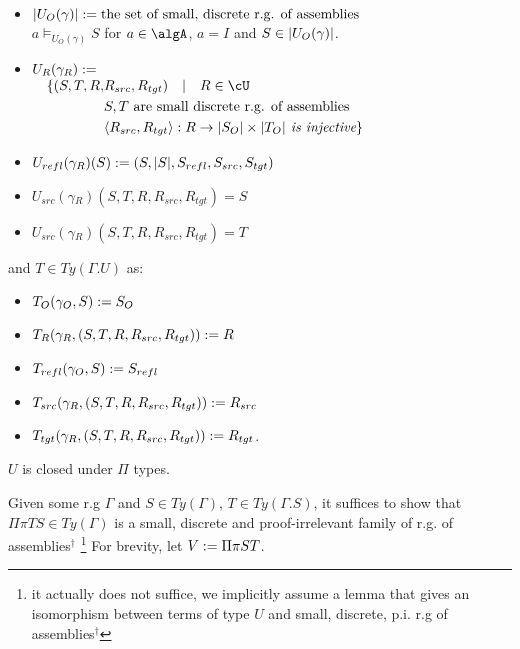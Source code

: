 \documentclass[12pt,a4paper]{article}
\def\src{_{src}}
\def\rfl{_{refl}}
\def\tgt{_{tgt}}
\renewcommand{\O}{_{O}}\alwaysmath{O}
\newcommand{\R}{\ensuremath{_{R}}}
\begin{document}
\begin{itemize}
  \item $\carr{U\O(\gamma)} \define \text{the set of small, discrete r.g. of assemblies}$ \\
   $a \vDash_{U\O(\gamma)} S$ for $a \in \algA$, $a = I$ and $S \in \carr{U\O(\gamma)}$. 
   
  \item $U\R(\gamma\R) \define$\\
  $\begin{aligned}
   \quad \{(S,T, R, & R\src, R\tgt) \quad|\quad R \in \cU \\
    & S,T \text{ are small discrete r.g. of assemblies} \\
    & \langle R\src, R\tgt\rangle : R \to \carr{S\O} \times \carr{T\O} \textit { is injective} \}
  \end{aligned}$
  
  \item $U\rfl(\gamma\R)(S) \define (S, \carr{S}, S\rfl, S\src, S\tgt)$
  
  \item $U\src(\gamma\R)(S, T, R, R\src, R\tgt) = S$
  
  \item $U\src(\gamma\R)(S, T, R, R\src, R\tgt) = T$
\end{itemize}
and $T \in Ty(\Gamma . U)$ as:
\begin{itemize}
  \item $T\O(\gamma\O, S) \define S\O$
  \item $T\R(\gamma\R, (S,T, R, R\src, R\tgt)) \define R$
  \item $T\rfl(\gamma\O, S) \define S\rfl$
  \item $T\src(\gamma\R, (S,T, R, R\src, R\tgt)) \define R\src$
  \item $T\tgt(\gamma\R, (S,T, R, R\src, R\tgt)) \define R\tgt$.
\end{itemize}
\begin{claim} $U$ is closed under $\Pi$ types.
\end{claim}
Given some r.g $\Gamma$ and $S \in Ty(\Gamma)$, $T \in Ty(\Gamma.S)$, it suffices to show that $\Pi \pi T S \in Ty(\Gamma)$ is a small, discrete and proof-irrelevant family of r.g. of assemblies$^\dagger$ \footnote{it actually does not suffice, we implicitly assume a lemma that gives an isomorphism between terms of type $U$ and small, discrete, p.i. r.g of assemblies$^\dagger$} For brevity, let $V := \Pi \pi S T$.\\
\end{document}
